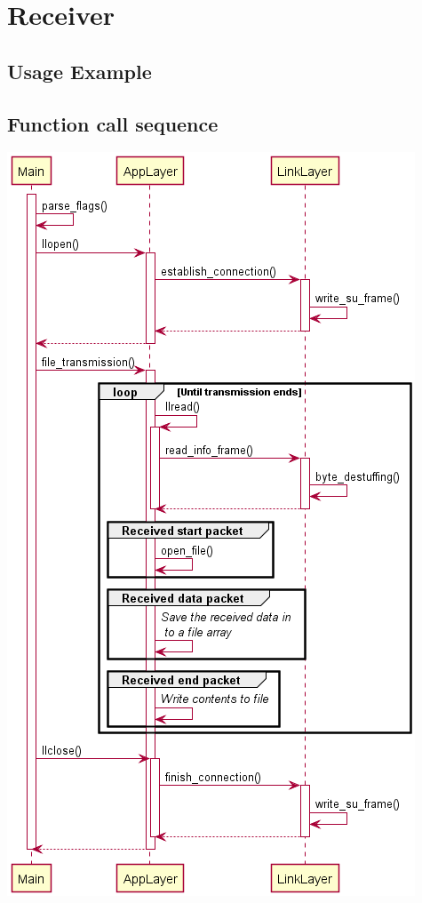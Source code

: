 \documentclass[11pt]{report}
\begin{document}
\newpage

\section{Receiver}

\subsection{Usage Example}


\subsection{Function call sequence}

\begin{center}
    \includegraphics[height=0.8\textheight]{images/Receiver.png}
\end{center}
\end{document}
